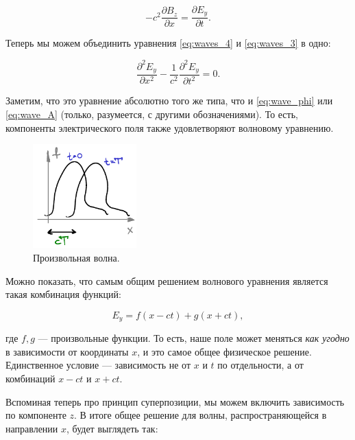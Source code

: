 \documentclass[12pt,a4paper]{article}
\numberwithin{equation}{section}
\numberwithin{equation}{section}
\newcommand{\pt}{\partial}
\begin{document}
\begin{equation}
  \label{eq:waves_4}
  -c^2 \frac{\pt B_z}{\pt x} = \frac{\pt E_y}{\pt t}.
\end{equation}

Теперь мы можем объединить уравнения \eqref{eq:waves_4} и
\eqref{eq:waves_3} в одно: 

\begin{equation}
  \label{eq:waves_E}
  \frac{\pt^2 E_y}{\pt x^2} - \frac{1}{c^2} \frac{\pt^2 E_y}{\pt t^2}=0.
\end{equation}

Заметим, что это уравнение абсолютно того же типа, что и
\eqref{eq:wave_phi} или \eqref{eq:wave_A} (только, разумеется, с
другими обозначениями). То есть, компоненты электрического поля также
удовлетворяют волновому уравнению. 

\begin{figure}
  \vspace{-1cm}
  \begin{center}
  \includegraphics[width=4cm]{wave.pdf}  
  \end{center}
  \caption{Произвольная волна.}
  \label{fig:wave}
\end{figure}


Можно показать, что самым общим решением волнового уравнения является
такая комбинация функций: 

\begin{equation}
  \label{eq:waves_general_solution_1}
  E_y = f(x-ct) + g(x+ct),
\end{equation}

где $f,g$ --- произвольные функции. То есть, наше поле может меняться
\textit{как угодно} в зависимости от координаты $x$, и это самое общее
физическое решение. Единственное условие --- зависимость не от $x$ и
$t$ по отдельности, а от комбинаций $x-ct$ и $x+ct$. 


Вспоминая теперь про принцип суперпозиции, мы можем включить
зависимость по компоненте $z$. В итоге общее решение для волны,
распространяющейся в направлении $x$, будет выглядеть так: 
\end{document}
